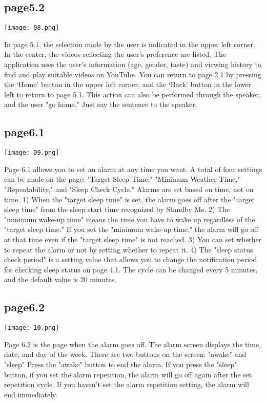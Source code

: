 \documentclass[conference]{IEEEtran}
\begin{document}
\subsection{page5.2}
\centerline{\texttt{[image: 08.png]}}
In page 5.1, the selection made by the user is indicated in the upper left corner. In the center, the videos reflecting the user's preference are listed. The application uses the user's information (age, gender, taste) and viewing history to find and play suitable videos on YouTube. You can return to page 2.1 by pressing the ‘Home’ button in the upper left corner, and the ‘Back’ button in the lower left to return to page 5.1. This action can also be performed through the speaker, and the user "go home." Just say the sentence to the speaker.
\subsection{page6.1}
\centerline{\texttt{[image: 09.png]}}
Page 6.1 allows you to set an alarm at any time you want. A total of four settings can be made on the page: "Target Sleep Time," "Minimum Weather Time," "Repeatability," and "Sleep Check Cycle." Alarms are set based on time, not on time. 1) When the "target sleep time" is set, the alarm goes off after the "target sleep time" from the sleep start time recognized by Standby Me. 2) The "minimum wake-up time" means the time you have to wake up regardless of the "target sleep time." If you set the "minimum wake-up time," the alarm will go off at that time even if the "target sleep time" is not reached. 3) You can set whether to repeat the alarm or not by setting whether to repeat it. 4) The "sleep status check period" is a setting value that allows you to change the notification period for checking sleep status on page 4.1. The cycle can be changed every 5 minutes, and the default value is 20 minutes.

\subsection{page6.2}
\centerline{\texttt{[image: 10.png]}}
Page 6.2 is the page when the alarm goes off. The alarm screen displays the time, date, and day of the week. There are two buttons on the screen: "awake" and "sleep" Press the "awake" button to end the alarm. If you press the "sleep" button, if you set the alarm repetition, the alarm will go off again after the set repetition cycle. If you haven't set the alarm repetition setting, the alarm will end immediately.
\end{document}
